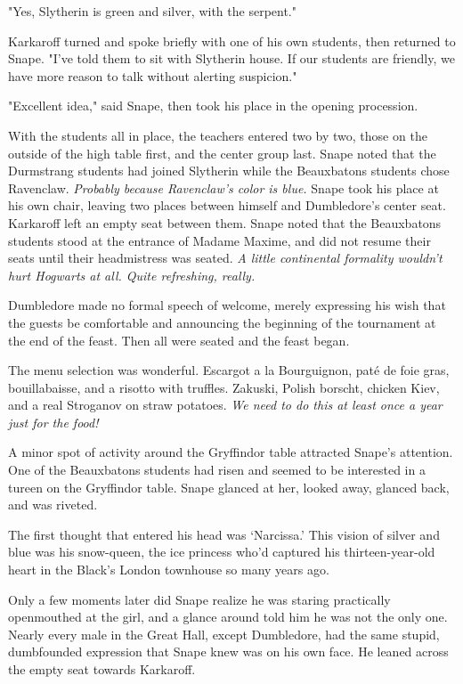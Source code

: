 "Yes, Slytherin is green and silver, with the serpent."

Karkaroff turned and spoke briefly with one of his own students, then returned to Snape. "I've told them to sit with Slytherin house. If our students are friendly, we have more reason to talk without alerting suspicion."

"Excellent idea," said Snape, then took his place in the opening procession.

With the students all in place, the teachers entered two by two, those on the outside of the high table first, and the center group last. Snape noted that the Durmstrang students had joined Slytherin while the Beauxbatons students chose Ravenclaw. \emph{Probably because Ravenclaw's color is blue.} Snape took his place at his own chair, leaving two places between himself and Dumbledore's center seat. Karkaroff left an empty seat between them. Snape noted that the Beauxbatons students stood at the entrance of Madame Maxime, and did not resume their seats until their headmistress was seated. \emph{A little continental formality wouldn't hurt Hogwarts at all. Quite refreshing, really.}

Dumbledore made no formal speech of welcome, merely expressing his wish that the guests be comfortable and announcing the beginning of the tournament at the end of the feast. Then all were seated and the feast began.

The menu selection was wonderful. Escargot a la Bourguignon, paté de foie gras, bouillabaisse, and a risotto with truffles. Zakuski, Polish borscht, chicken Kiev, and a real Stroganov on straw potatoes. \emph{We need to do this at least once a year just for the food!}

A minor spot of activity around the Gryffindor table attracted Snape's attention. One of the Beauxbatons students had risen and seemed to be interested in a tureen on the Gryffindor table. Snape glanced at her, looked away, glanced back, and was riveted.

The first thought that entered his head was `Narcissa.' This vision of silver and blue was his snow-queen, the ice princess who'd captured his thirteen-year-old heart in the Black's London townhouse so many years ago.

Only a few moments later did Snape realize he was staring practically openmouthed at the girl, and a glance around told him he was not the only one. Nearly every male in the Great Hall, except Dumbledore, had the same stupid, dumbfounded expression that Snape knew was on his own face. He leaned across the empty seat towards Karkaroff.

